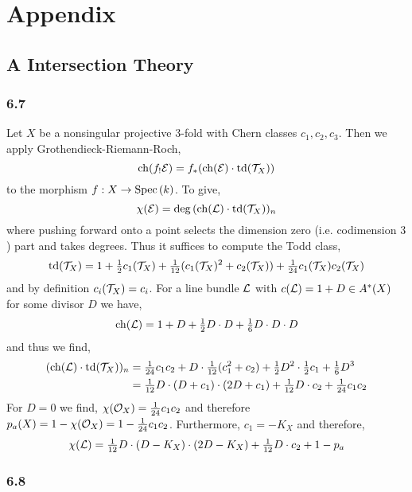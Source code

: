 \documentclass[12pt]{article}
\begin{document}
\section{Appendix}

\subsection{A Intersection Theory}

\subsubsection{6.7}

\newcommand{\td}{\mathrm{td}}
\renewcommand{\ch}{\mathrm{ch}}

Let $X$ be a nonsingular projective $3$-fold with Chern classes $c_1, c_2, c_3$. Then we apply Grothendieck-Riemann-Roch,
\[ \ch(f_! \E) = f_* (\mathrm{ch}(\E) \cdot \td(\T_X)) \]
to the morphism $f : X \to \mathrm{Spec}\left( k \right)$. To give,
\[ \chi(\E) = \deg{(\ch(\L) \cdot \td(\T_X))_n} \]
where pushing forward onto a point selects the dimension zero (i.e. codimension $3$) part and takes degrees.
Thus it suffices to compute the Todd class,
\[ \td(\T_X) = 1 + \tfrac{1}{2} c_1(\T_X) + \tfrac{1}{12} (c_1(\T_X)^2 + c_2(\T_X)) + \tfrac{1}{24} c_1(\T_X) c_2(\T_X) \]
and by definition $c_i(\mathcal{T}_X) = c_i$. For a line bundle $\mathcal{L}$ with $c(\mathcal{L}) = 1 + D \in A^*(X)$ for some divisor $D$ we have,
\[ \ch(\L) = 1 + D + \tfrac{1}{2} D \cdot D + \tfrac{1}{6} D \cdot D \cdot D \]
and thus we find,
\begin{align*}
(\ch(\L) \cdot \td(\T_X))_n & = \tfrac{1}{24} c_1 c_2 + D \cdot \tfrac{1}{12} (c_1^2 + c_2) + \tfrac{1}{2} D^2 \cdot \tfrac{1}{2} c_1 + \tfrac{1}{6} D^3 
\\
& = \tfrac{1}{12} D \cdot (D + c_1) \cdot (2 D + c_1) + \tfrac{1}{12} D \cdot c_2 + \tfrac{1}{24} c_1 c_2
\end{align*}
For $D = 0$ we find, $\chi(\mathcal{O}_{X}) = \tfrac{1}{24} c_1 c_2$
and therefore $p_a(X) = 1 - \chi(\mathcal{O}_{X}) = 1 - \tfrac{1}{24} c_1 c_2$. Furthermore, $c_1 = -K_X$ and therefore,
\[ \chi(\mathcal{L}) = \tfrac{1}{12} D \cdot (D - K_X) \cdot (2D - K_X) + \tfrac{1}{12} D \cdot c_2 + 1 - p_a \]

\subsubsection{6.8}
\end{document}
